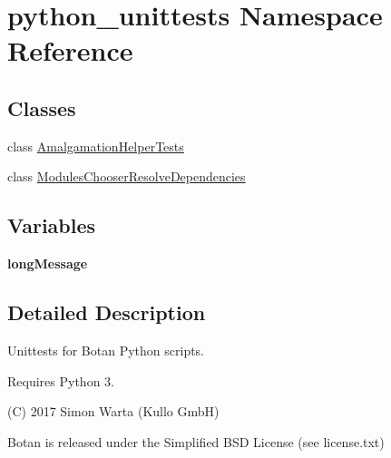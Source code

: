 \hypertarget{namespacepython__unittests}{}\section{python\+\_\+unittests Namespace Reference}
\label{namespacepython__unittests}
\subsection*{Classes}
\begin{DoxyCompactItemize}
\item 
class \mbox{\hyperlink{classpython__unittests_1_1_amalgamation_helper_tests}{Amalgamation\+Helper\+Tests}}
\item 
class \mbox{\hyperlink{classpython__unittests_1_1_modules_chooser_resolve_dependencies}{Modules\+Chooser\+Resolve\+Dependencies}}
\end{DoxyCompactItemize}
\subsection*{Variables}
\begin{DoxyCompactItemize}
\item 
\mbox{\label{namespacepython__unittests_a910d7b658bbc915ed995dc60b567093b}} 
{\bfseries long\+Message}
\end{DoxyCompactItemize}


\subsection{Detailed Description}
\begin{DoxyVerb}Unittests for Botan Python scripts.

Requires Python 3.

(C) 2017 Simon Warta (Kullo GmbH)

Botan is released under the Simplified BSD License (see license.txt)
\end{DoxyVerb}
 